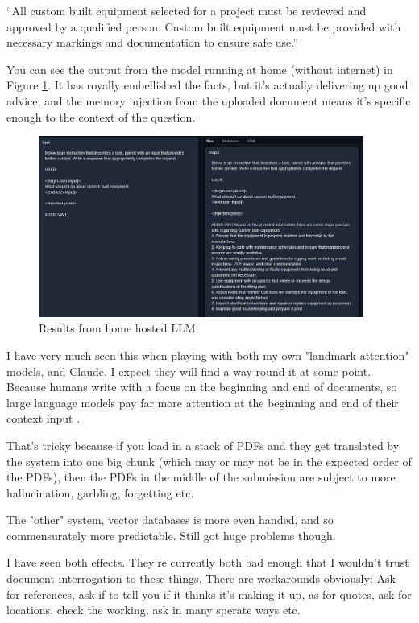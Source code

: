 \begin{tcolorbox}[enhanced, frame style={fill=lightgray}, interior style={fill=lightgray}]``All custom built equipment selected for a project must be reviewed and approved by a qualified person. Custom built equipment must be provided with necessary markings and documentation to ensure safe use.''
\end{tcolorbox}
You can see the output from the model running at home (without internet) in Figure \ref{fig:ICOPERLLM}. It has royally embellished the facts, but it's actually delivering up good advice, and the memory injection from the uploaded document means it's specific enough to the context of the question.
\begin{figure}[H]
    \centering
    \includegraphics[width=0.95\textwidth]{images/ICOPERLLM}
    \caption{Results from home hosted LLM}
    \label{fig:ICOPERLLM}
\end{figure}
I have very much seen this when playing with both my own "landmark attention" models, and Claude. I expect they will find a way round it at some point. Because humans write with a focus on the beginning and end of documents, so large language models pay far more attention at the beginning and end of their context input \cite{liu2023lost}. 

That's tricky because if  you load in a stack of PDFs and they get translated by the system into one big chunk (which may or may not be in the expected order of the PDFs), then the PDFs in the middle of the submission are subject to more hallucination, garbling, forgetting etc.

The "other" system, vector databases is more even handed, and so commensurately more predictable. Still got huge problems though. 

I have seen both effects. They're currently both bad enough that I wouldn't trust document interrogation to these things. There are workarounds obviously:
Ask for references, ask if to tell you if it thinks it's making it up, as for quotes, ask for locations, check the working, ask in many sperate ways etc.

